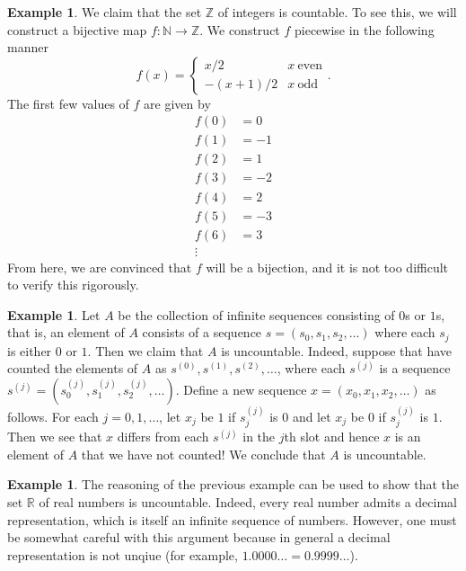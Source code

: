 \documentclass[12pt]{article}
\theoremstyle{definition}
\newtheorem{example}[definition]{Example}
\theoremstyle{theorem}
\begin{document}
\begin{example}
We claim that the set $\mathbb{Z}$ of integers is countable. To see this, we will construct a bijective map $f : \mathbb{N} \to \mathbb{Z}$. We construct $f$ piecewise in the following manner 
\[
f(x) = \begin{cases}
x/2 & x \: \text{even} \\
-(x+1)/2 & x \: \text{odd}
\end{cases}.
\]
The first few values of $f$ are given by 
\begin{align*}
f(0) &= 0 \\
f(1) &= -1 \\
f(2) &= 1 \\
f(3) &= -2 \\
f(4) &= 2 \\
f(5) &= -3 \\
f(6) &= 3 \\
\vdots 
\end{align*} 
From here, we are convinced that $f$ will be a bijection, and it is not too difficult to verify this rigorously. 
\end{example}

\begin{example}
Let $A$ be the collection of infinite sequences consisting of $0$s or $1$s, that is, an element of $A$ consists of a sequence $s = (s_0, s_1, s_2, \ldots)$ where each $s_j$ is either $0$ or $1$. Then we claim that $A$ is uncountable. Indeed, suppose that have counted the elements of $A$ as $s^{(0)}, s^{(1)}, s^{(2)}, \ldots$, where each $s^{(j)}$ is a sequence $s^{(j)} = (s^{(j)}_0, s^{(j)}_1, s^{(j)}_2, \ldots)$. Define a new sequence $x = (x_0, x_1, x_2, \ldots)$ as follows. For each $j =0, 1, \ldots$, let $x_j$ be $1$ if $s_j^{(j)}$ is $0$ and let $x_j$ be $0$ if $s_j^{(j)}$ is $1$. Then we see that $x$ differs from each $s^{(j)}$ in the $j$th slot and hence $x$ is an element of $A$ that we have not counted! We conclude that $A$ is uncountable. 
\end{example} 

\begin{example}
The reasoning of the previous example can be used to show that the set $\mathbb{R}$ of real numbers is uncountable. Indeed, every real number admits a decimal representation, which is itself an infinite sequence of numbers. However, one must be somewhat careful with this argument because in general a decimal representation is not unqiue (for example, $1.0000\ldots = 0.9999\ldots$). 
\end{example}
\end{document}
